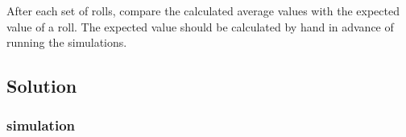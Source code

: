 \documentclass[a4paper, 10pt]{article}
\begin{document}
            After each set of rolls, compare the calculated average values with the expected value of a roll. The expected value should be calculated by hand in advance of running the simulations.

        \subsection{Solution}
            \subsubsection{simulation}
                
\end{document}
